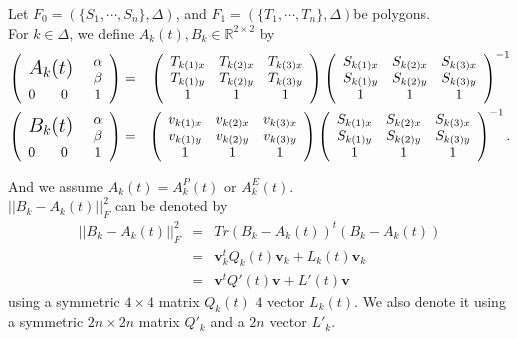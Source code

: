 \documentclass[8pt]{article}
\begin{document}
Let $F_0 = (\{S_1,\cdots ,S_n\},\Delta)$, and $F_1 =(\{T_1,\cdots ,T_n\},\Delta)$be polygons.\\
For $k \in \Delta$, we define $A_k(t) , B_k \in \mathbb{R}^{2 \times 2}$ by \\
\begin{eqnarray*}
\left(
     \begin{array}{ccc}
 	\multicolumn{2}{c}{\multirow{2}{*}{\mbox {\smash{\Large $A_k(t)$ }}}}&\alpha \\
    	\multicolumn{2}{c}{}&\beta\\
      0&0&1   
     \end{array}
  \right) &=&
  \left(
    \begin{array}{ccc}
      T_{k(1)x} & T_{k(2)x} & T_{k(3)x} \\
      T_{k(1)y} & T_{k(2)y} & T_{k(3)y} \\
      1 & 1 & 1
    \end{array}
  \right)
  \left(
    \begin{array}{ccc}
      S_{k(1)x} & S_{k(2)x} & S_{k(3)x} \\
      S_{k(1)y} & S_{k(2)y} & S_{k(3)y} \\
      1 & 1 & 1
    \end{array}
  \right)^{-1}  \\
\left(
     \begin{array}{ccc}
 	\multicolumn{2}{c}{\multirow{2}{*}{\mbox {\smash{\Large $B_k(t)$ }}}}&\alpha \\
    	\multicolumn{2}{c}{}&\beta\\
      0&0&1   
     \end{array}
  \right) &=&
  \left(
    \begin{array}{ccc}
      v_{k(1)x} & v_{k(2)x} & v_{k(3)x} \\
      v_{k(1)y} & v_{k(2)y} & v_{k(3)y} \\
      1 & 1 & 1
    \end{array}
  \right)
  \left(
    \begin{array}{ccc}
      S_{k(1)x} & S_{k(2)x} & S_{k(3)x} \\
      S_{k(1)y} & S_{k(2)y} & S_{k(3)y} \\
      1 & 1 & 1
    \end{array}
  \right)^{-1}.  \\
\end{eqnarray*}

And we assume $A_k(t) = A^P_k(t)$ or $ A^E_k(t)$.\\
$||B_k - A_k(t)||^2_F$ can be denoted by\\
\begin{eqnarray*}
||B_k - A_k(t)||^2_F &=& Tr(B_k - A_k(t))^t(B_k - A_k(t))\\
&=& \mathbf{v}^t_k Q_k(t) \mathbf{v}_k + L_k(t) \mathbf{v}_k\\
&=& \mathbf{v}^t Q' (t) \mathbf{v} + L'(t) \mathbf{v}
\end{eqnarray*}
using a symmetric $4 \times 4$ matrix $Q_k(t)$ $4$ vector $L_k(t)$. We also denote it using a symmetric $2n \times 2n$ matrix $Q'_k$ and a $2n$ vector $L'_k$.\\
\end{document}
